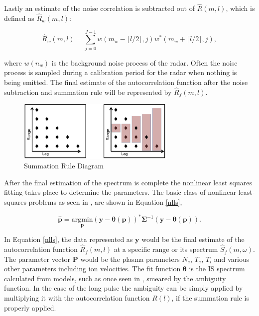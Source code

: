 \documentclass[draft,ras]{agutex}
\begin{document}
\begin{article}

Lastly an estimate of the noise correlation is subtracted out of $\hat{R}(m,l)$, which is defined as $\hat{R}_w(m,l)$:

\begin{equation}
\label{eq:lagpronoise}
\hat{R}_w(m,l) = \displaystyle\sum\limits_{j=0}^{J-1} w(m_w-\lfloor l/2\rfloor,j)w^*(m_w+\lceil l/2 \rceil,j),
\end{equation}

\noindent where $w(n_w)$ is the background noise process of the radar.  Often the noise process is sampled during a calibration period for the radar when nothing is being emitted.  The final estimate of the autocorrelation function after the noise subtraction and summation rule will be represented by $\hat{R}_f(m,l)$.
\begin{figure}[!t]
\centering
\includegraphics[width=3in]{sumrule}
\caption{Summation Rule Diagram}
\label{fig:sumrule}
\end{figure}

After the final estimation of the spectrum is complete the nonlinear least squares fitting takes place to determine the parameters.  The basic class of nonlinear least-squares problems as seen in \citep{kayvol1}, are shown in Equation \ref{nlls},

\begin{equation}
	\hat{\mathbf{p}}= \underset{\mathbf{p}}{\text{argmin}} (\mathbf{y}-\bm{\theta}(\mathbf{p}))^*\bm{\Sigma}^{-1}(\mathbf{y}-\bm{\theta}(\mathbf{p})).
\label{nlls}
\end{equation}

In Equation \ref{nlls}, the data represented as $\mathbf{y}$ would be the final estimate of the autocorrelation function $\hat{R}_f(m,l)$ at a specific range or its spectrum $\hat{S}_f(m,\omega)$.  The parameter vector $\mathbf{P}$ would be the plasma parameters $N_e$, $T_e$, $T_i$ and various other parameters including ion velocities. The fit function $\bm{\theta}$ is the IS spectrum calculated from models, such as once seen in \citep{kudeki:milla:1}, smeared by the ambiguity function.  In the case of the long pulse the ambiguity can be simply applied by multiplying it with the autocorrelation function $R(l)$, if the summation rule is properly applied. 


\end{article}
\end{document}
